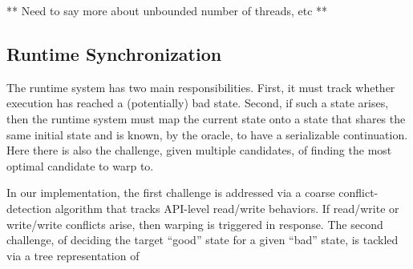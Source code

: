 ** Need to say more about unbounded number of threads, etc **

\subsection{Runtime Synchronization} 

The runtime system has two main responsibilities. First, it must track whether execution has reached a (potentially) bad state. Second, if such a state arises, then the runtime system must map the current state onto a state that shares the same initial state and is known, by the oracle, to have a serializable continuation. Here there is also the challenge, given multiple candidates, of finding the most optimal candidate to warp to.

In our implementation, the first challenge is addressed via a coarse conflict-detection algorithm that tracks API-level read/write behaviors. If read/write or write/write conflicts arise, then warping is triggered in response. The second challenge, of deciding the target ``good'' state for a given ``bad'' state, is tackled via a tree representation of 